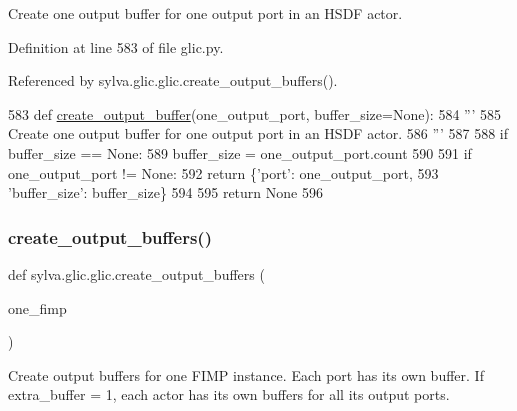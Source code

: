\begin{DoxyVerb}  Create one output buffer for one output port in an HSDF actor.
\end{DoxyVerb}
 

Definition at line 583 of file glic.\+py.



Referenced by sylva.\+glic.\+glic.\+create\+\_\+output\+\_\+buffers().


\begin{DoxyCode}
583     \textcolor{keyword}{def }\hyperlink{namespacesylva_1_1glic_1_1glic_a414741c04de0838d506dbeee050368a6}{create\_output\_buffer}(one\_output\_port, buffer\_size=None):
584         \textcolor{stringliteral}{'''}
585 \textcolor{stringliteral}{          Create one output buffer for one output port in an HSDF actor.}
586 \textcolor{stringliteral}{        '''}
587 
588         \textcolor{keywordflow}{if} buffer\_size == \textcolor{keywordtype}{None}:
589             buffer\_size = one\_output\_port.count
590 
591         \textcolor{keywordflow}{if} one\_output\_port != \textcolor{keywordtype}{None}:
592             \textcolor{keywordflow}{return} \{\textcolor{stringliteral}{'port'}: one\_output\_port,
593                     \textcolor{stringliteral}{'buffer\_size'}: buffer\_size\}
594 
595         \textcolor{keywordflow}{return} \textcolor{keywordtype}{None}
596 
\end{DoxyCode}
\mbox{\label{namespacesylva_1_1glic_1_1glic_a53c55762a3c7d476be7ee748baeccbeb}} 
\subsubsection{\texorpdfstring{create\+\_\+output\+\_\+buffers()}{create\_output\_buffers()}}
{\footnotesize\ttfamily def sylva.\+glic.\+glic.\+create\+\_\+output\+\_\+buffers (\begin{DoxyParamCaption}\item[{}]{one\+\_\+fimp }\end{DoxyParamCaption})}

\begin{DoxyVerb}  Create output buffers for one FIMP instance.
  Each port has its own buffer.
  If extra_buffer = 1,
    each actor has its own buffers for all its output ports.
\end{DoxyVerb}
 

